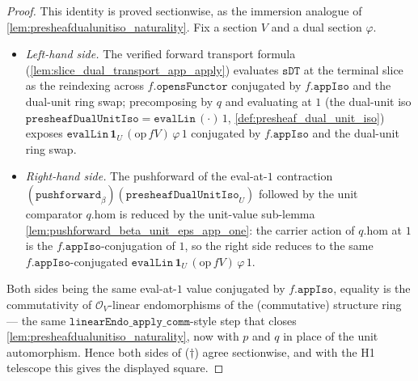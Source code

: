 \begin{proof}
  This identity is proved sectionwise, as the immersion analogue of
  \cref{lem:presheafdualunitiso_naturality}. Fix a section \(V\) and a dual section \(\varphi\).
  \begin{itemize}
    \item \emph{Left-hand side.} The verified forward transport formula
      (\cref{lem:slice_dual_transport_app_apply}) evaluates \(\mathtt{sDT}\) at the terminal slice as
      the reindexing across \(f.\mathtt{opensFunctor}\) conjugated by \(f.\mathtt{appIso}\) and the
      dual-unit ring swap; precomposing by \(q\) and evaluating at \(1\) (the dual-unit iso
      \(\mathtt{presheafDualUnitIso} = \mathtt{evalLin}\,(\cdot)\,1\),
      \cref{def:presheaf_dual_unit_iso}) exposes \(\mathtt{evalLin}\,\mathbf 1_U\,(\mathrm{op}\,fV)\,
      \varphi\,1\) conjugated by \(f.\mathtt{appIso}\) and the dual-unit ring swap.
    \item \emph{Right-hand side.} The pushforward of the eval-at-\(1\) contraction
      \((\mathtt{pushforward}_\beta)(\mathtt{presheafDualUnitIso}_U)\) followed by the unit comparator
      \(q.\mathrm{hom}\) is reduced by the unit-value sub-lemma
      \cref{lem:pushforward_beta_unit_eps_app_one}: the carrier action of \(q.\mathrm{hom}\) at \(1\)
      is the \(f.\mathtt{appIso}\)-conjugation of \(1\), so the right side reduces to the same
      \(f.\mathtt{appIso}\)-conjugated \(\mathtt{evalLin}\,\mathbf 1_U\,(\mathrm{op}\,fV)\,\varphi\,1\).
  \end{itemize}
  Both sides being the same eval-at-\(1\) value conjugated by \(f.\mathtt{appIso}\), equality is the
  commutativity of \(\mathcal{O}_V\)-linear endomorphisms of the (commutative) structure ring --- the
  same \(\mathtt{linearEndo\_apply\_comm}\)-style step that closes
  \cref{lem:presheafdualunitiso_naturality}, now with \(p\) and \(q\) in place of the unit
  automorphism. Hence both sides of ($\dagger$) agree sectionwise, and with the H1 telescope this gives the displayed
  square.
\end{proof}


